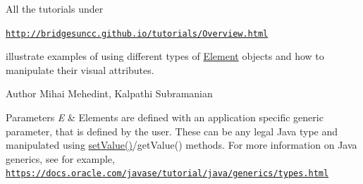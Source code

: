 All the tutorials under

\href{http://bridgesuncc.github.io/tutorials/Overview.html}{\tt http\+://bridgesuncc.\+github.\+io/tutorials/\+Overview.\+html}

illustrate examples of using different types of \hyperlink{classbridges_1_1base_1_1_element}{Element} objects and how to manipulate their visual attributes.

\begin{DoxyAuthor}{Author}
Mihai Mehedint, Kalpathi Subramanian
\end{DoxyAuthor}

\begin{DoxyParams}{Parameters}
{\em E} & Elements are defined with an application specific generic parameter, that is defined by the user. These can be any legal Java type and manipulated using \hyperlink{classbridges_1_1base_1_1_element_ab3cf1241da0bc4c59cea9d6f0fd7aaf4}{set\+Value()}/get\+Value() methods. For more information on Java generics, see for example, \href{https://docs.oracle.com/javase/tutorial/java/generics/types.html}{\tt https\+://docs.\+oracle.\+com/javase/tutorial/java/generics/types.\+html} \\
\hline
\end{DoxyParams}

